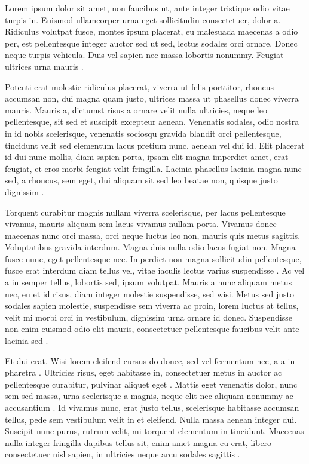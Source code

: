 Lorem ipsum dolor sit amet, non faucibus ut, ante integer tristique odio
vitae turpis in. Euismod ullamcorper urna eget sollicitudin consectetuer,
dolor a. Ridiculus volutpat fusce, montes ipsum placerat, eu malesuada
maecenas a odio per, est pellentesque integer auctor sed ut sed, lectus
sodales orci ornare. Donec neque turpis vehicula. Duis vel sapien nec massa
lobortis nonummy. Feugiat ultrices urna mauris \cite{Gazette2017}.

Potenti erat molestie ridiculus placerat, viverra ut felis porttitor,
rhoncus accumsan non, dui magna quam justo, ultrices massa ut phasellus
donec viverra mauris. Mauris a, dictumst risus a ornare velit nulla
ultricies, neque leo pellentesque, sit sed et suscipit excepteur
aenean. Venenatis sodales, odio nostra in id nobis scelerisque, venenatis
sociosqu gravida blandit orci pellentesque, tincidunt velit sed elementum
lacus pretium nunc, aenean vel dui id. Elit placerat id dui nunc mollis,
diam sapien porta, ipsam elit magna imperdiet amet, erat feugiat, et eros
morbi feugiat velit fringilla. Lacinia phasellus lacinia magna nunc sed, a
rhoncus, sem eget, dui aliquam sit sed leo beatae non, quisque justo
dignissim \cite{Anschutz2011}.

Torquent curabitur magnis nullam viverra scelerisque, per lacus pellentesque
vivamus, mauris aliquam sem lacus vivamus nullam porta. Vivamus donec
maecenas nunc orci massa, orci neque luctus leo non, mauris quis metus
sagittis. Voluptatibus gravida interdum. Magna duis nulla odio lacus fugiat
non. Magna fusce nunc, eget pellentesque nec. Imperdiet non magna
sollicitudin pellentesque, fusce erat interdum diam tellus vel, vitae
iaculis lectus varius suspendisse \cite{Druide2023}. Ac vel a in semper tellus, lobortis sed,
ipsum volutpat. Mauris a nunc aliquam metus nec, eu et id risus, diam
integer molestie suspendisse, sed wisi. Metus sed justo sodales sapien
molestie, suspendisse sem viverra ac proin, lorem luctus at tellus, velit mi
morbi orci in vestibulum, dignissim urna ornare id donec. Suspendisse non
enim euismod odio elit mauris, consectetuer pellentesque faucibus velit ante
lacinia sed \cite{Guttag2011, Com2018, Audevart2018}.

Et dui erat. Wisi lorem eleifend cursus do donec, sed vel fermentum nec, a a
in pharetra \cite{Gouvernement2023}. Ultricies risus, eget habitasse in, consectetuer metus in
auctor ac pellentesque curabitur, pulvinar aliquet eget \cite{Hinton2016}. Mattis eget
venenatis dolor, nunc sem sed massa, urna scelerisque a magnis, neque elit
nec aliquam nonummy ac accusantium \cite{Corrosion2018}. Id vivamus nunc, erat justo tellus,
scelerisque habitasse accumsan tellus, pede sem vestibulum velit in et
eleifend. Nulla massa aenean integer dui. Suscipit nunc purus, rutrum velit,
mi torquent elementum in tincidunt. Maecenas nulla integer fringilla dapibus
tellus sit, enim amet magna eu erat, libero consectetuer nisl sapien, in
ultricies neque arcu sodales sagittis \cite{CSA2002}.

